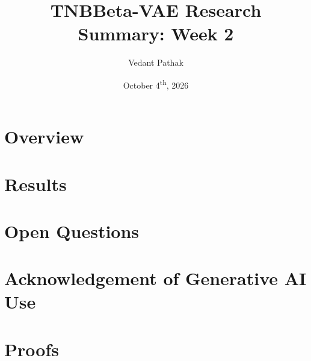 \documentclass[12pt]{article}
\title{TNBBeta-VAE Research Summary: Week 2}
\author[1]{Vedant Pathak}
\affil[1]{Department of Statistics, University of Chicago}
\date{October 4\textsuperscript{th}, 2026}
\begin{document}
\maketitle

\section{Overview}


\section{Results}


\section{Open Questions}


\section*{Acknowledgement of Generative AI Use}


\appendix
\section{Proofs}




\end{document}
